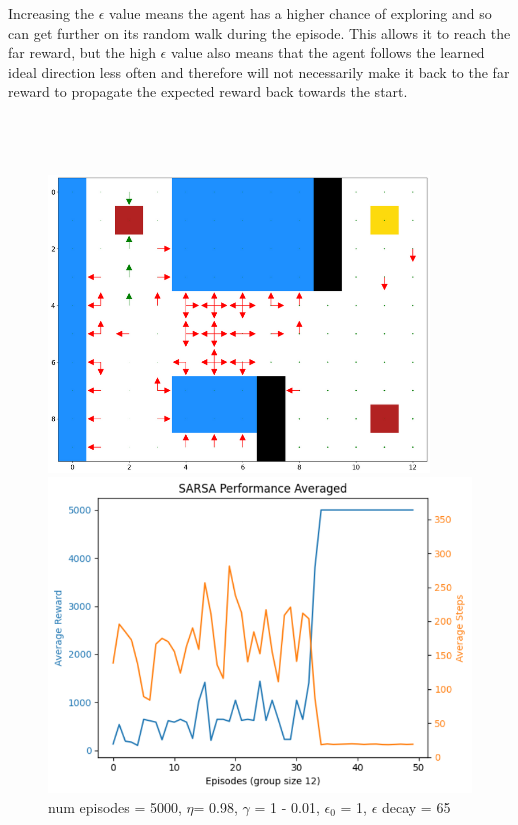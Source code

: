 \documentclass[12pt]{article}
\begin{document}
Increasing the $\epsilon$ value means the agent has a higher chance of exploring and so can get further on its random walk during the episode. This allows it to reach the far reward, but the high $\epsilon$ value also means that the agent follows the learned ideal direction less often and therefore will not necessarily make it back to the far reward to propagate the expected reward back towards the start. 
\\ \\ \\ \\

\begin{figure}
  \centering
\begin{minipage}{.28\textwidth}
  \includegraphics[width=0.9\textwidth]{5 Q plot.png}
  \caption{  num episodes = 5000, $\eta$= 0.98, $\gamma$ = 1 - 0.01, $\epsilon_0$ = 1, $\epsilon$ decay = 65}
\end{minipage}%
\begin{minipage}{.32\textwidth}
  \centering
  \includegraphics[width=1\textwidth]{10 performance plot.png}
\end{minipage}
\end{figure}
\end{document}

